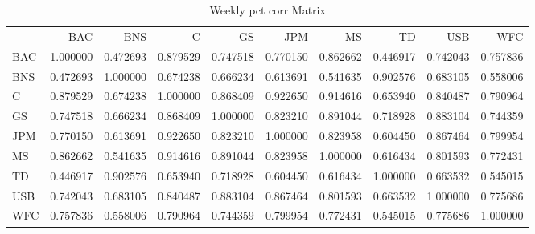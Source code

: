 \documentclass{article}
\begin{document}
\begin{table}
\caption{Weekly pct corr Matrix}
\label{tab:weekly_pct_corr}
\begin{tabular}{lrrrrrrrrr}
 & BAC & BNS & C & GS & JPM & MS & TD & USB & WFC \\
BAC & 1.000000 & 0.472693 & 0.879529 & 0.747518 & 0.770150 & 0.862662 & 0.446917 & 0.742043 & 0.757836 \\
BNS & 0.472693 & 1.000000 & 0.674238 & 0.666234 & 0.613691 & 0.541635 & 0.902576 & 0.683105 & 0.558006 \\
C & 0.879529 & 0.674238 & 1.000000 & 0.868409 & 0.922650 & 0.914616 & 0.653940 & 0.840487 & 0.790964 \\
GS & 0.747518 & 0.666234 & 0.868409 & 1.000000 & 0.823210 & 0.891044 & 0.718928 & 0.883104 & 0.744359 \\
JPM & 0.770150 & 0.613691 & 0.922650 & 0.823210 & 1.000000 & 0.823958 & 0.604450 & 0.867464 & 0.799954 \\
MS & 0.862662 & 0.541635 & 0.914616 & 0.891044 & 0.823958 & 1.000000 & 0.616434 & 0.801593 & 0.772431 \\
TD & 0.446917 & 0.902576 & 0.653940 & 0.718928 & 0.604450 & 0.616434 & 1.000000 & 0.663532 & 0.545015 \\
USB & 0.742043 & 0.683105 & 0.840487 & 0.883104 & 0.867464 & 0.801593 & 0.663532 & 1.000000 & 0.775686 \\
WFC & 0.757836 & 0.558006 & 0.790964 & 0.744359 & 0.799954 & 0.772431 & 0.545015 & 0.775686 & 1.000000 \\
\end{tabular}
\end{table}
\end{document}
